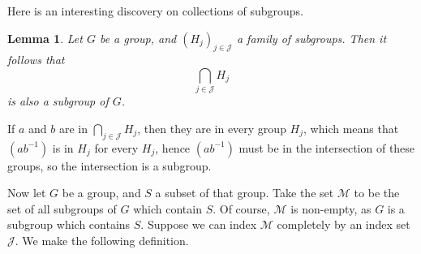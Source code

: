 \documentclass[12pt]{amsbook}
\makeatletter
\theoremstyle{plain}
\newtheorem{lemma}[theorem]{Lemma}
\theoremstyle{definition}
\renewenvironment{proof}[1][\proofname]{\par
  \pushQED{\qed}%
  \normalfont \topsep6\p@\@plus6\p@\relax
  \list{}{\leftmargin=0em
          \rightmargin=\leftmargin
          \settowidth{\itemindent}{\itshape#1}%
          \labelwidth=\itemindent}

  \item[\hskip\labelsep
        \itshape
    #1\@addpunct{.}]\ignorespaces
}{%
  \popQED\endlist\@endpefalse
}
\makeatother
\begin{document}
\begin{center}
\end{center}

Here is an interesting discovery on collections of subgroups.

\begin{lemma}
    Let $G$ be a group, and $(H_j)_{j \in \mathcal{J}}$ a family of subgroups. Then it follows that
    \[ \bigcap_{j \in \mathcal{J}} H_j \]
    is also a subgroup of $G$.
\end{lemma}
\begin{proof}
    If $a$ and $b$ are in $\bigcap_{j \in \mathcal{J}} H_j$, then they are in every group $H_j$, which means that $(ab^{-1})$ is in $H_j$ for every $H_j$, hence $(ab^{-1})$ must be in the intersection of these groups, so the intersection is a subgroup.
\end{proof}

Now let $G$ be a group, and $S$ a subset of that group. Take the set $\mathcal{M}$ to be the set of all subgroups of $G$ which contain $S$. Of course, $\mathcal{M}$ is non-empty, as $G$ is a subgroup which contains $S$. Suppose we can index $\mathcal{M}$ completely by an index set $\mathcal{J}$. We make the following definition.
\end{document}
